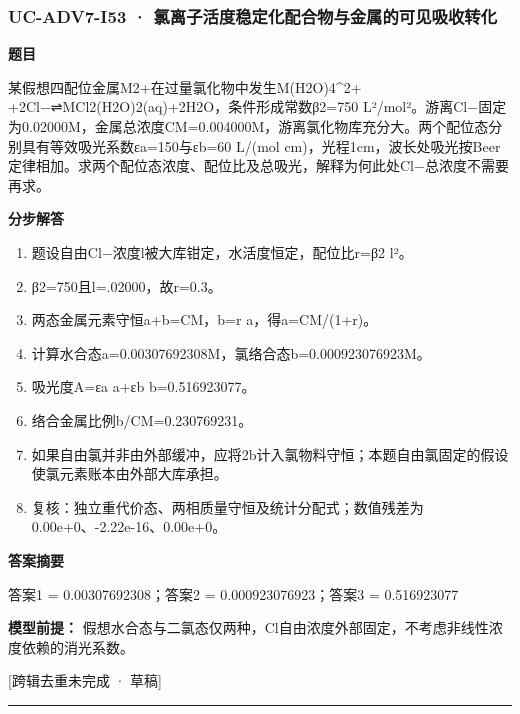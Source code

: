 \documentclass[UTF8,11pt,a4paper]{ctexart}
\begin{document}
\subsubsection*{UC-ADV7-I53 · 氯离子活度稳定化配合物与金属的可见吸收转化}
\noindent\textbf{题目}\par
某假想四配位金属M2+在过量氯化物中发生M(H2O)4\textasciicircum{}2+ +2Cl−⇌MCl2(H2O)2(aq)+2H2O，条件形成常数β2=750 L²/mol²。游离Cl−固定为0.02000M，金属总浓度CM=0.004000M，游离氯化物库充分大。两个配位态分别具有等效吸光系数εa=150与εb=60 L/(mol cm)，光程1cm，波长处吸光按Beer定律相加。求两个配位态浓度、配位比及总吸光，解释为何此处Cl−总浓度不需要再求。\par
\medskip\noindent\textbf{分步解答}
\begin{enumerate}
\item 题设自由Cl−浓度l被大库钳定，水活度恒定，配位比r=β2 l²。
\item β2=750且l=.02000，故r=0.3。
\item 两态金属元素守恒a+b=CM，b=r a，得a=CM/(1+r)。
\item 计算水合态a=0.00307692308M，氯络合态b=0.000923076923M。
\item 吸光度A=εa a+εb b=0.516923077。
\item 络合金属比例b/CM=0.230769231。
\item 如果自由氯并非由外部缓冲，应将2b计入氯物料守恒；本题自由氯固定的假设使氯元素账本由外部大库承担。
\item 复核：独立重代价态、两相质量守恒及统计分配式；数值残差为0.00e+0、-2.22e-16、0.00e+0。
\end{enumerate}
\noindent\textbf{答案摘要}\par
答案1 = 0.00307692308；答案2 = 0.000923076923；答案3 = 0.516923077\par
\noindent\textbf{模型前提：}
假想水合态与二氯态仅两种，Cl自由浓度外部固定，不考虑非线性浓度依赖的消光系数。\par
\noindent\textcolor{red!65!black}{[跨辑去重未完成 · 草稿]} \par
\medskip\hrule\medskip
{}
\end{document}
